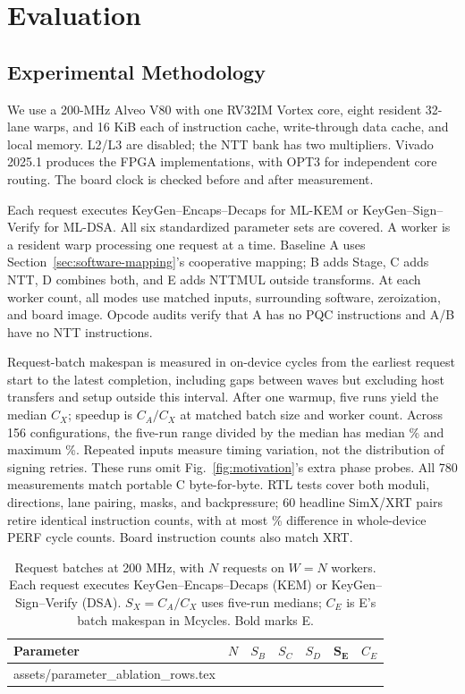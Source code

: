 \documentclass[conference,letterpaper]{IEEEtran}
\makeatletter
\newcommand{\tablerows}[1]{\@@input #1 }
\makeatother
\begin{document}
\section{Evaluation}
\label{sec:evaluation}
\subsection{Experimental Methodology}
We use a 200-MHz Alveo V80 with one RV32IM Vortex core, eight resident
32-lane warps, and 16 KiB each of instruction cache, write-through data cache,
and local memory. L2/L3 are disabled; the NTT bank has two multipliers.
Vivado 2025.1 produces the FPGA implementations, with OPT3 for independent
core routing. The board clock is checked before and after measurement.

Each request executes KeyGen--Encaps--Decaps for ML-KEM or
KeyGen--Sign--Verify for ML-DSA. All six standardized parameter sets are
covered. A worker is a resident warp processing one request at a time.
Baseline A uses Section~\ref{sec:software-mapping}'s cooperative mapping;
B adds Stage, C adds NTT, D combines both, and E adds NTTMUL outside
transforms. At each worker count, all modes use matched inputs, surrounding
software, zeroization, and board image. Opcode audits verify that A has no
PQC instructions and A/B have no NTT instructions.

Request-batch makespan is measured in on-device cycles from the earliest
request start to the latest completion, including gaps between waves but
excluding host transfers and setup outside this interval.
After one warmup, five runs yield the median $C_X$; speedup is $C_A/C_X$
at matched batch size and worker count. Across 156 configurations, the
five-run range divided by the median has median \BoardRepeatSpreadMedian{}\% and maximum \BoardRepeatSpreadMax{}\%.
Repeated inputs measure timing variation, not the distribution of signing
retries. These runs omit Fig.~\ref{fig:motivation}'s extra phase probes.
All 780 measurements match portable C byte-for-byte. RTL tests cover both
moduli, directions, lane pairing, masks, and backpressure; 60 headline
SimX/XRT pairs retire identical instruction counts, with at most
\HeadlineParityMax{}\% difference in whole-device PERF cycle counts.
Board instruction counts also match XRT.

\begin{table}[t]
\caption{Request batches at 200 MHz, with $N$ requests on $W=N$ workers.
Each request executes KeyGen--Encaps--Decaps (KEM) or
KeyGen--Sign--Verify (DSA). $S_X=C_A/C_X$ uses five-run medians;
$C_E$ is E's batch makespan in Mcycles. Bold marks E.}
\label{tab:requests}
\centering\footnotesize
\begin{tabular*}{\columnwidth}{@{\extracolsep{\fill}}lrrrrrr@{}}
\toprule
Parameter & $N$ & $S_B$ & $S_C$ & $S_D$ & $\mathbf{S_E}$ & $C_E$\\
\midrule
\tablerows{assets/parameter_ablation_rows.tex}
\bottomrule
\end{tabular*}
\end{table}
\end{document}
